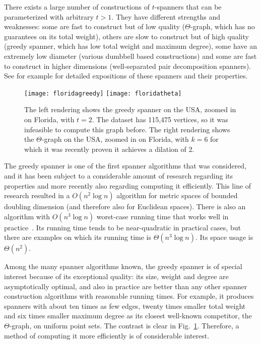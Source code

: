 \documentclass[runningheads,envcountsame,oribibl,orivec]{llncs}
\begin{document}
There exists a large number of constructions of $t$-spanners that can be parameterized with arbitrary $t>1$. They have different strengths and weaknesses: some are fast to construct but of low quality ($\Theta$-graph, which has no guarantees on its total weight), others are slow to construct but of high quality (greedy spanner, which has low total weight and maximum degree), some have an extremely low diameter (various dumbbell based constructions) and some are fast to construct in higher dimensions (well-separated pair decomposition spanners). See for example \cite{Narasimhan:2007:GSN:1208237} for detailed expositions of these spanners and their properties.

\begin{figure}[t]\centering
\texttt{[image: floridagreedy]}
\texttt{[image: floridatheta]}
\caption{The left rendering shows the greedy spanner on the USA, zoomed in on Florida, with $t=2$. The dataset has 115,475 vertices, so it was infeasible to compute this graph before. The right rendering shows the $\Theta$-graph on the USA, zoomed in on Florida, with $k=6$ for which it was recently proven it achieves a dilation of 2.}
\label{figure:greedy}
\end{figure}

The greedy spanner is one of the first spanner algorithms that was considered, and it has been subject to a considerable amount of research regarding its properties and more recently also regarding computing it efficiently. This line of research resulted in a $O(n^2 \log n)$ algorithm \cite{BoseCFMS2010} for metric spaces of bounded doubling dimension (and therefore also for Euclidean spaces). There is also an algorithm with $O(n^3 \log n)$ worst-case running time that works well in practice~\cite{FarshiG09}. Its running time tends to be near-quadratic in practical cases, but there are examples on which its running time is $\Theta(n^3 \log n)$. Its space usage is $\Theta(n^2)$.

Among the many spanner algorithms known, the greedy spanner is of special interest because of its exceptional quality: its size, weight and degree are asymptotically optimal, and also in practice are better than any other spanner construction algorithms with reasonable running times. For example, it produces spanners with about ten times as few edges, twenty times smaller total weight and six times smaller maximum degree as its closest well-known competitor, the $\Theta$-graph, on uniform point sets. The contrast is clear in Fig.~\ref{figure:greedy}. Therefore, a method of computing it more efficiently is of considerable interest.
\end{document}
